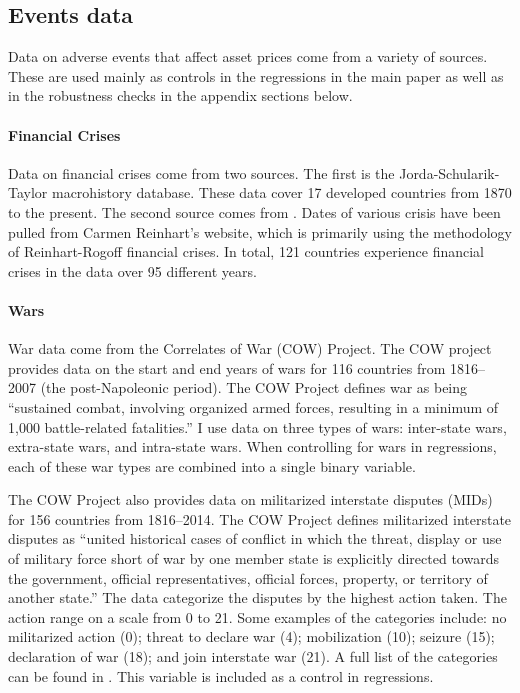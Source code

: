 \subsection{Events data}\label{section:events_data}

Data on adverse events that affect asset prices come from a variety of sources. These are used mainly as controls in the regressions in the main paper as well as in the robustness checks in the appendix sections below.

\paragraph{Financial Crises}
Data on financial crises come from two sources. The first is the Jorda-Schularik-Taylor macrohistory database. These data cover 17 developed countries from 1870 to the present. The second source comes from \cite{Reinhart2009}. Dates of various crisis have been pulled from Carmen Reinhart’s website, which is primarily using the methodology of Reinhart-Rogoff financial crises. In total, 121 countries experience financial crises in the data over 95 different years.

\paragraph{Wars}
War data come from the Correlates of War (COW) Project. The COW project provides data on the start and end years of wars for 116 countries from 1816--2007 (the post-Napoleonic period). The COW Project defines war as being ``sustained combat, involving organized armed forces, resulting in a minimum of 1,000 battle-related fatalities.''  I use data on three types of wars: inter-state wars, extra-state wars, and intra-state wars.  When controlling for wars in regressions, each of these war types are combined into a single binary variable.

The COW Project also provides data on militarized interstate disputes (MIDs) for 156 countries from 1816--2014. The COW Project defines militarized interstate disputes as ``united historical cases of conflict in which the threat, display or use of military force short of war by one member state is explicitly directed towards the government, official representatives, official forces, property, or territory of another state.''  The data categorize the disputes by the highest action taken. The action range on a scale from 0 to 21. Some examples of the categories include: no militarized action (0); threat to declare war (4); mobilization (10); seizure (15); declaration of war (18); and join interstate war (21). A full list of the categories can be found in \cite{Palmer2020}. This variable is  included as a control in regressions.

